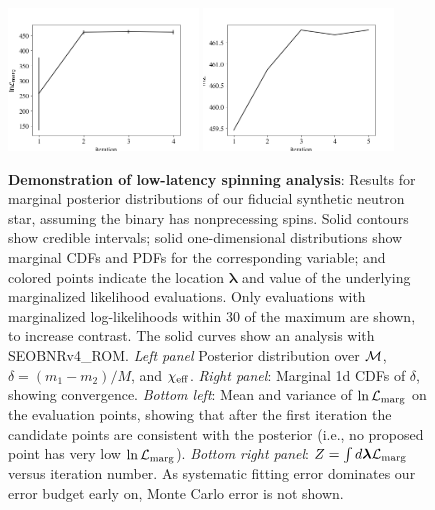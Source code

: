 \documentclass[twocolumn,prd,nofootinbib]{revtex4}
\newcommand\editremark[1]{{\color{red} #1}}
\newcommand{\mc}{{\cal M}}
\begin{document}
\begin{figure}
\includegraphics[width=0.45\textwidth]{figures/bns_withspin_lnL_meanVar.png}
\includegraphics[width=0.45\textwidth]{figures/bns_withspin_lnL_converge.png}
\caption{\label{fig:BNS:Spin}\textbf{Demonstration of low-latency spinning analysis}:
Results for marginal posterior distributions
  of our fiducial synthetic neutron star, assuming the binary has nonprecessing spins.  Solid contours show credible intervals; solid one-dimensional distributions
  show marginal CDFs and PDFs for the corresponding variable; and colored points indicate the location $\bm{\lambda}$ and
  value of the underlying marginalized likelihood evaluations.  Only evaluations with marginalized log-likelihoods within $30$ of the maximum are shown, to increase contrast. The solid curves show an analysis with SEOBNRv4\_ROM.
 \emph{Left panel } Posterior distribution
  over  $\mc$,
  $\delta=(m_1-m_2)/M$, and $\chi_{\rm eff}$.    \emph{Right panel}: Marginal 1d CDFs of $\delta$, showing convergence.
\emph{Bottom left}: Mean and variance of  $\ln{\cal L}_{\rm marg}$ on the evaluation points,  showing that after the
first iteration the
candidate points are consistent with the posterior (i.e., no proposed point has very low $\ln {\cal L}_{\rm marg}$).
\emph{Bottom right panel}: $Z = \int d\bm{\lambda} {\cal L}_{\rm marg}$ versus iteration number.  As systematic fitting error dominates our
error budget early on, Monte Carlo error is not shown.
}
\end{figure}
\end{document}

